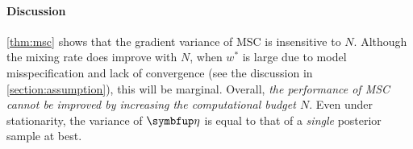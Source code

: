 
\vspace{0.04in}


\vspace{-0.15in}
\paragraph{Discussion}
\cref{thm:msc} shows that the gradient variance of MSC is insensitive to \(N\).
Although the mixing rate does improve with \(N\), when \(w^*\) is large due to model misspecification and lack of convergence (see the discussion in \cref{section:assumption}), this will be marginal.
Overall, \textit{the performance of MSC cannot be improved by increasing the computational budget \(N\)}.
Even under stationarity, the variance of \(\veta\) is equal to that of a \textit{single} posterior sample at best.

\vspace{-0.1in}
